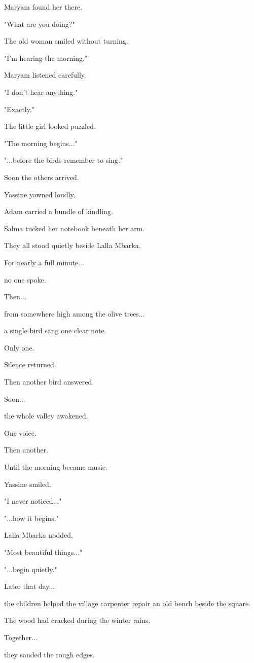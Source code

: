\documentclass[12pt,openany]{book}
\begin{document}
Maryam found her there.

"What are you doing?"

The old woman smiled without turning.

"I'm hearing the morning."

Maryam listened carefully.

"I don't hear anything."

"Exactly."

The little girl looked puzzled.

"The morning begins..."

"...before the birds remember to sing."

Soon the others arrived.

Yassine yawned loudly.

Adam carried a bundle of kindling.

Salma tucked her notebook beneath her arm.

They all stood quietly beside Lalla Mbarka.

For nearly a full minute...

no one spoke.

Then...

from somewhere high among the olive trees...

a single bird sang one clear note.

Only one.

Silence returned.

Then another bird answered.

Soon...

the whole valley awakened.

One voice.

Then another.

Until the morning became music.

Yassine smiled.

"I never noticed..."

"...how it begins."

Lalla Mbarka nodded.

"Most beautiful things..."

"...begin quietly."

Later that day...

the children helped the village carpenter repair an old bench beside the square.

The wood had cracked during the winter rains.

Together...

they sanded the rough edges.
\end{document}
